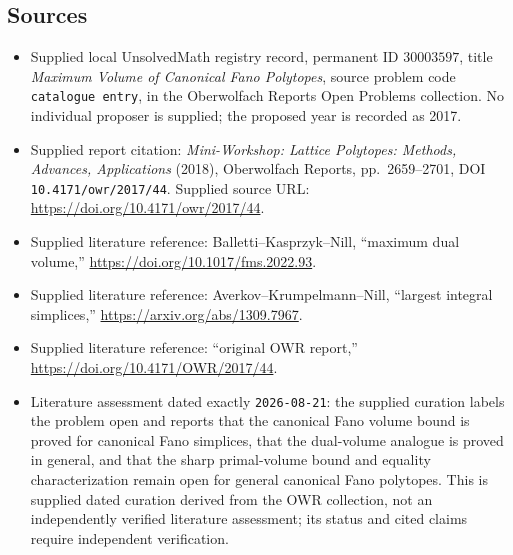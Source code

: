 \documentclass[11pt]{article}
\begin{document}
\subsection{Sources}
\begin{itemize}
\item Supplied local UnsolvedMath registry record, permanent ID \(30003597\), title \emph{Maximum Volume of Canonical Fano Polytopes}, source problem code \texttt{catalogue entry}, in the Oberwolfach Reports Open Problems collection. No individual proposer is supplied; the proposed year is recorded as 2017.
\item Supplied report citation: \emph{Mini-Workshop: Lattice Polytopes: Methods, Advances, Applications} (2018), Oberwolfach Reports, pp.\ 2659--2701, DOI \texttt{10.4171/owr/2017/44}. Supplied source URL: \url{https://doi.org/10.4171/owr/2017/44}.
\item Supplied literature reference: Balletti--Kasprzyk--Nill, ``maximum dual volume,'' \url{https://doi.org/10.1017/fms.2022.93}.
\item Supplied literature reference: Averkov--Krumpelmann--Nill, ``largest integral simplices,'' \url{https://arxiv.org/abs/1309.7967}.
\item Supplied literature reference: ``original OWR report,'' \url{https://doi.org/10.4171/OWR/2017/44}.
\item Literature assessment dated exactly \texttt{2026-08-21}: the supplied curation labels the problem open and reports that the canonical Fano volume bound is proved for canonical Fano simplices, that the dual-volume analogue is proved in general, and that the sharp primal-volume bound and equality characterization remain open for general canonical Fano polytopes. This is supplied dated curation derived from the OWR collection, not an independently verified literature assessment; its status and cited claims require independent verification.
\end{itemize}
\end{document}
